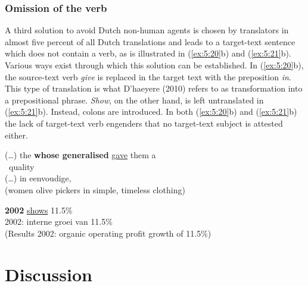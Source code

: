 \documentclass[output=paper]{LSP/langsci}
\begin{document}
\subsubsection{Omission of the verb}

A third solution to avoid Dutch non-human agents is chosen by translators in almost five percent of all Dutch translations and leads to a target-text sentence which does not contain a verb, as is illustrated in (\ref{ex:5:20}b) and (\ref{ex:5:21}b). Various ways exist through which this solution can be established. In (\ref{ex:5:20}b), the source-text verb \textit{give} is replaced in the target text with the preposition \textit{in}. This type of translation is what D’haeyere (2010) refers to as transformation into a prepositional phrase. \textit{Show}, on the other hand, is left untranslated in (\ref{ex:5:21}b). Instead, colons are introduced. In both (\ref{ex:5:20}b) and (\ref{ex:5:21}b) the lack of target-text verb engenders that no target-text subject is attested either.     


\ea \label{ex:5:20} 
\ea
(\dots) the  \textbf{whose generalised}  \ul{gave} them a \\\, quality\\[1em]
\ex
(\dots)  in eenvoudige,  \\
(women olive pickers in simple, timeless clothing)
\z
\z


\ea \label{ex:5:21}
\ea
\textbf{2002}  \ul{shows} 11.5\% \\[1em]
\ex {} 2002: interne groei  van 11.5\%\\
(Results 2002: organic operating profit growth of 11.5\%)
\z
\z




\section{Discussion}
\end{document}
